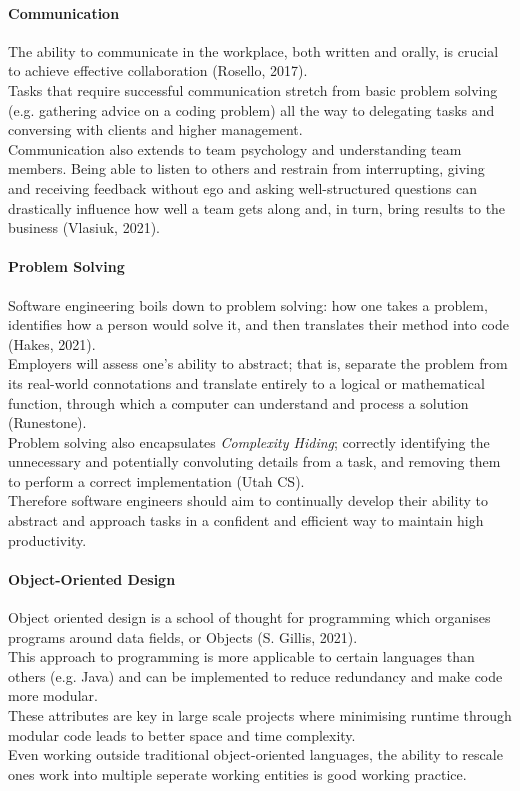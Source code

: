 \documentclass[a4paper, 11pt]{report}
\begin{document}
	\paragraph{Communication} The ability to communicate in the workplace, both written and orally, is crucial to achieve effective collaboration (Rosello, 2017). 
	\\Tasks that require successful communication stretch from basic problem solving (e.g. gathering advice on a coding problem) all the way to delegating tasks and conversing with clients and higher management.  
	\\Communication also extends to team psychology and understanding team members. Being able to listen to others and restrain from interrupting, giving and receiving feedback without ego and asking well-structured questions can drastically influence how well a team gets along and, in turn, bring results to the business (Vlasiuk, 2021).
	
	\paragraph{Problem Solving} Software engineering boils down to problem solving: how one takes a problem, identifies how a person would solve it, and then translates their method into code (Hakes, 2021). 
	\\Employers will assess one's ability to abstract; that is, separate the problem from its real-world connotations and translate entirely to a logical or mathematical function, through which a computer can understand and process a solution (Runestone). 
	\\Problem solving also encapsulates \textit{Complexity Hiding}; correctly identifying the unnecessary and potentially convoluting details from a task, and removing them to perform a correct implementation (Utah CS). 
	\\Therefore software engineers should aim to continually develop their ability to abstract and approach tasks in a confident and efficient way to maintain high productivity. 
	
	\paragraph{Object-Oriented Design} Object oriented design is a school of thought for programming which organises programs around data fields, or Objects (S. Gillis, 2021). 
	\\This approach to programming is more applicable to certain languages than others (e.g. Java) and can be implemented to reduce redundancy and make code more modular.
	\\These attributes are key in large scale projects where minimising runtime through modular code leads to better space and time complexity. 
	\\Even working outside traditional object-oriented languages, the ability to rescale ones work into multiple seperate working entities is good working practice.
	
\end{document}
